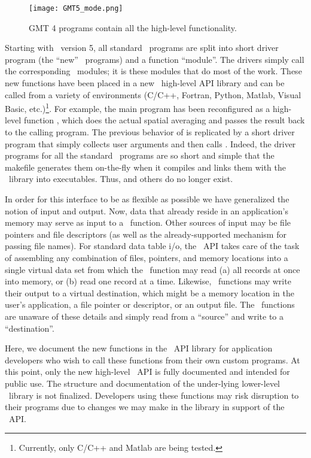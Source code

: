 \documentclass[11pt]{report}
\begin{document}
\begin{figure}[h]
	\centering
	\texttt{[image: GMT5\_mode.png]}
	\caption{GMT 4 programs contain all the high-level functionality.}
\end{figure}
Starting with \GMT\ version 5, all standard \GMT\ programs are split into short driver
program (the ``new'' \GMT\  programs) and a function ``module''.  The drivers simply call the corresponding \GMT\ modules;
it is these modules that do most of the work.  These new functions have been placed
in a new \GMT\ high-level API library and can be called from a variety of environments
(C/C++, Fortran, Python, Matlab, Visual Basic, etc.)\footnote{Currently, only C/C++ and Matlab are being tested.}.
For example, the main program
 has been reconfigured as a high-level function ,
which does the actual spatial averaging and passes the result back to the calling program.
The previous behavior of  is replicated by a short driver program
that simply collects user arguments and then calls .  Indeed, the driver
programs for all the standard \GMT\ programs are so short and simple that the makefile generates them
on-the-fly when it compiles and links them with the \GMT\ library into executables.
Thus,  and others do no longer exist.

In order for this interface to be as flexible as possible we have generalized the notion of input
and output. Now, data that already reside in an application's memory may serve as
input to a \GMT\ function.  Other sources of input may be file pointers
and file descriptors (as well as the already-supported mechanism for passing file names).
For standard data table i/o, the \GMT\ API takes care of the task of assembling any combination
of files, pointers, and memory locations into a single virtual data set from which the \GMT\
function may read (a) all records at once into memory, or (b) read one record at a time.
Likewise, \GMT\ functions may write their output to a virtual destination, which
might be a memory location in the user's application, a file pointer or descriptor, or
an output file.  The \GMT\ functions are unaware of these details and simply
read from a ``source'' and write to a ``destination''.

Here, we document the new functions in the \GMT\ API library for application developers
who wish to call these functions from their own custom programs.  At this point,
only the new high-level \GMT\ API is fully documented and intended for public use.
The structure and documentation of the under-lying lower-level \GMT\ library is not finalized.
Developers using these functions may risk disruption to their programs due to changes we may
make in the library in support of the \GMT\ API.
\end{document}
